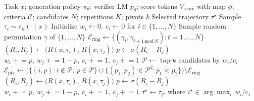 \vspace{2.5em}

\begin{algorithm}[h]
\caption{\textbf{Probabilistic Pivot Tournament with Ring-based Pivot Selection.} A random Hamiltonian cycle is first scored to give every candidate one ``A'' position and one ``B'' position; the top-$k$ candidates by ring mean preference become the pivots, and each remaining candidate is compared only against the pivot set using the soft preference probability of Eq.~\ref{eq:pref}.}
\label{alg:testtime}
\small
\begin{algorithmic}[1]
\Require Task $x$; generation policy $\pi_\theta$; verifier LM $p_\theta$;
score tokens $V_{\text{score}}$ with map $\phi$; criteria $\mathcal{C}$;
candidates $N$; repetitions $K$; pivots $k$
\Ensure Selected trajectory $\tau^\star$
 
    \State Sample $\tau_i \sim \pi_\theta(\cdot \mid x)$
\EndFor
\State Initialize $w_i \gets 0,\ c_i \gets 0$ for $i\in\{1,\ldots,N\}$
\State Sample random permutation $\gamma$ of $\{1,\ldots,N\}$ 
\State $\mathcal{E}_{\text{ring}} \gets \{(\gamma_t,\gamma_{t+1\,\mathrm{mod}\,N}) : t=1,\ldots,N\}$
    \State $(R_i, R_j) \gets \big(R(x,\tau_i),\, R(x,\tau_j)\big)$ 
    \State $p \gets \sigma(R_i - R_j)$ 
    \State $w_i \mathrel{+}= p,\ w_j \mathrel{+}= 1-p,\ c_i \mathrel{+}= 1,\ c_j \mathrel{+}= 1$
\EndFor
\State $\mathcal{P} \gets$ top-$k$ candidates by $w_i / c_i$ 
\State $\mathcal{E}_{\text{piv}} \gets \big(\{(i,p): i\!\notin\!\mathcal{P},\, p\!\in\!\mathcal{P}\}\cup\{(p_1,p_2)\!\in\!\mathcal{P}^2 : p_1<p_2\}\big)\setminus \mathcal{E}_{\text{ring}}$
 
    \State $(R_i, R_j) \gets \big(R(x,\tau_i),\, R(x,\tau_j)\big)$ 
    \State $p \gets \sigma(R_i - R_j)$ 
    \State $w_i \mathrel{+}= p,\ w_j \mathrel{+}= 1-p,\ c_i \mathrel{+}= 1,\ c_j \mathrel{+}= 1$
\EndFor
\State \Return $\tau^\star \gets \tau_{i^\star}$ where $i^\star \in \arg\max_i\, w_i / c_i$
\end{algorithmic}
\end{algorithm}

\vspace{2.5em}

